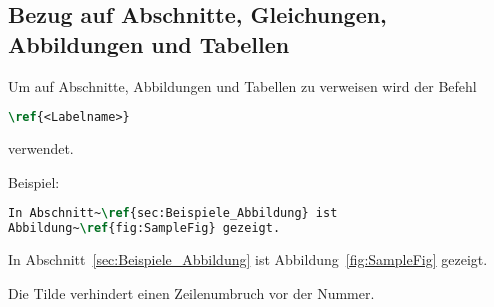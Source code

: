\subsection{Bezug auf Abschnitte, Gleichungen, Abbildungen und Tabellen}
\label{sec:Beispiele_Referenz}
%
Um auf Abschnitte, Abbildungen und Tabellen zu verweisen wird der Befehl
%
\begin{lstlisting}[language=tex]
\ref{<Labelname>}
\end{lstlisting}
%
verwendet.
\par
Beispiel:
\begin{lstlisting}[language=tex]
In Abschnitt~\ref{sec:Beispiele_Abbildung} ist 
Abbildung~\ref{fig:SampleFig} gezeigt.
\end{lstlisting}
In Abschnitt~\ref{sec:Beispiele_Abbildung} ist Abbildung~\ref{fig:SampleFig} gezeigt.
\par
Die Tilde verhindert einen Zeilenumbruch vor der Nummer.
%
%
%
